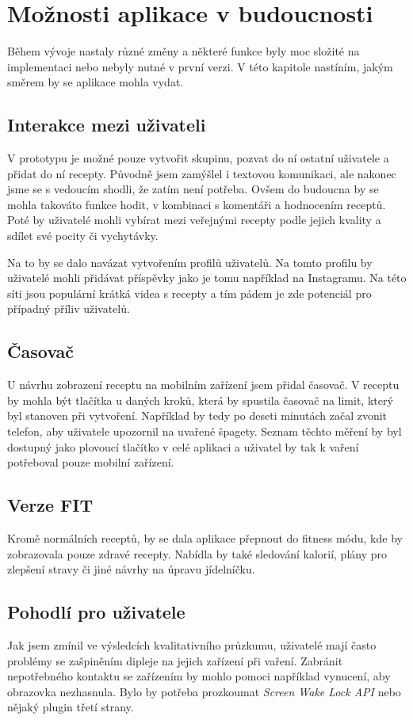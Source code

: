 
\chapter{Možnosti aplikace v budoucnosti}

Během vývoje nastaly různé změny a některé funkce byly moc složité na implementaci nebo nebyly nutné v první verzi.
V této kapitole nastíním, jakým směrem by se aplikace mohla vydat.

\section{Interakce mezi uživateli}
V prototypu je možné pouze vytvořit skupinu, pozvat do ní ostatní uživatele a přidat do ní recepty. Původně jsem zamýšlel
i textovou komunikaci, ale nakonec jsme se s vedoucím shodli, že zatím není potřeba. Ovšem do budoucna by se mohla takováto
funkce hodit, v kombinaci s komentáři a hodnocením receptů. Poté by uživatelé mohli vybírat mezi veřejnými recepty podle
jejich kvality a sdílet své pocity či vychytávky.

Na to by se dalo navázat vytvořením profilů uživatelů. Na tomto profilu by uživatelé mohli přidávat příspěvky jako je tomu
například na Instagramu. Na této síti jsou populární krátká videa s recepty a tím pádem je zde potenciál pro případný %
příliv uživatelů.

\section{Časovač}
U návrhu zobrazení receptu na mobilním zařízení jsem přidal časovač. V receptu by mohla být tlačítka u daných kroků, která
by spustila časovač na limit, který byl stanoven při vytvoření. Například by tedy po deseti minutách začal zvonit telefon, aby
uživatele upozornil na uvařené špagety. Seznam těchto měření by byl dostupný jako plovoucí tlačítko
v celé aplikaci a uživatel by tak k vaření potřeboval pouze mobilní zařízení.

\section{Verze FIT}
Kromě normálních receptů, by se dala aplikace přepnout do fitness módu, kde by zobrazovala pouze zdravé recepty. Nabídla by
také sledování kalorií, plány pro zlepšení stravy či jiné návrhy na úpravu jídelníčku.

\section{Pohodlí pro uživatele}
Jak jsem zmínil ve výsledcích kvalitativního průzkumu, uživatelé mají často problémy se zašpiněním dipleje na jejich zařízení při vaření.
Zabránit nepotřebného kontaktu se zařízením by mohlo pomoci například vynucení, aby obrazovka nezhasnula. Bylo by potřeba prozkoumat
\emph{Screen Wake Lock API} nebo nějaký plugin třetí strany. %

